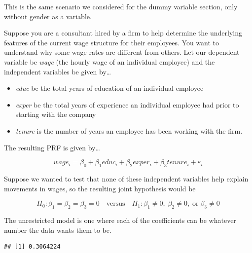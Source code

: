 \documentclass[
]{book}
\newenvironment{Shaded}{\begin{snugshade}}{\end{snugshade}}
\newcommand{\AttributeTok}[1]{\textcolor[rgb]{0.77,0.63,0.00}{#1}}
\newcommand{\FunctionTok}[1]{\textcolor[rgb]{0.00,0.00,0.00}{#1}}
\newcommand{\NormalTok}[1]{#1}
\newcommand{\OtherTok}[1]{\textcolor[rgb]{0.56,0.35,0.01}{#1}}
\newcommand{\SpecialCharTok}[1]{\textcolor[rgb]{0.00,0.00,0.00}{#1}}
\newcommand{\StringTok}[1]{\textcolor[rgb]{0.31,0.60,0.02}{#1}}
\begin{document}
This is the same scenario we considered for the dummy variable section, only without gender as a variable.

Suppose you are a consultant hired by a firm to help determine the underlying features of the current wage structure for their employees. You want to understand why some wage rates are different from others. Let our dependent variable be \emph{wage} (the hourly wage of an individual employee) and the independent variables be given by\ldots{}

\begin{itemize}
\item
  \emph{educ} be the total years of education of an individual employee
\item
  \emph{exper} be the total years of experience an individual employee had prior to starting with the company
\item
  \emph{tenure} is the number of years an employee has been working with the firm.
\end{itemize}

The resulting PRF is given by\ldots{}

\[wage_i=\beta_0+\beta_1educ_i+\beta_2exper_i+\beta_3tenure_i+\varepsilon_i\]

Suppose we wanted to test that none of these independent variables help explain movements in wages, so the resulting joint hypothesis would be

\[H_0: \beta_1 = \beta_2 = \beta_3 = 0 \quad \text{versus} \quad H_1: \beta_1 \neq 0, \; \beta_2 \neq 0, \; \text{or} \; \beta_3 \neq 0\]

The unrestricted model is one where each of the coefficients can be whatever number the data wants them to be.

\begin{Shaded}
\end{Shaded}

\begin{verbatim}
## [1] 0.3064224
\end{verbatim}
\end{document}
